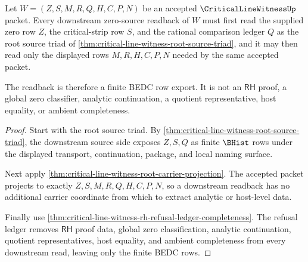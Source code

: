 \begin{theorem}
\label{thm:critical-line-witness-downstream-zero-source-readback}
Let $W=(Z,S,M,R,Q,H,C,P,N)$ be an accepted $\CriticalLineWitnessUp$ packet. Every downstream zero-source readback of $W$ must first read the supplied zero row $Z$, the critical-strip row $S$, and the rational comparison ledger $Q$ as the root source triad of \autoref{thm:critical-line-witness-root-source-triad}, and it may then read only the displayed rows $M,R,H,C,P,N$ needed by the same accepted packet.

The readback is therefore a finite BEDC row export. It is not an $\mathsf{RH}$ proof, a global zero classifier, analytic continuation, a quotient representative, host equality, or ambient completeness.
\end{theorem}
\begin{proof}
Start with the root source triad. By \autoref{thm:critical-line-witness-root-source-triad}, the downstream source side exposes $Z,S,Q$ as finite $\BHist$ rows under the displayed transport, continuation, package, and local naming surface.

Next apply \autoref{thm:critical-line-witness-root-carrier-projection}. The accepted packet projects to exactly $Z,S,M,R,Q,H,C,P,N$, so a downstream readback has no additional carrier coordinate from which to extract analytic or host-level data.

Finally use \autoref{thm:critical-line-witness-rh-refusal-ledger-completeness}. The refusal ledger removes $\mathsf{RH}$ proof data, global zero classification, analytic continuation, quotient representatives, host equality, and ambient completeness from every downstream read, leaving only the finite BEDC rows.
\end{proof}

